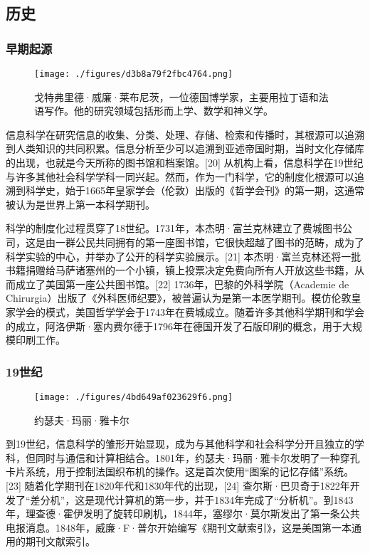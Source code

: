 \subsection{历史}  
\subsubsection{早期起源}
\begin{figure}[ht]
\centering
\texttt{[image: ./figures/d3b8a79f2fbc4764.png]}
\caption{戈特弗里德·威廉·莱布尼茨，一位德国博学家，主要用拉丁语和法语写作。他的研究领域包括形而上学、数学和神义学。} \label{fig_INCE_2}
\end{figure}
信息科学在研究信息的收集、分类、处理、存储、检索和传播时，其根源可以追溯到人类知识的共同积累。信息分析至少可以追溯到亚述帝国时期，当时文化存储库的出现，也就是今天所称的图书馆和档案馆。[20] 从机构上看，信息科学在19世纪与许多其他社会科学学科一同兴起。然而，作为一门科学，它的制度化根源可以追溯到科学史，始于1665年皇家学会（伦敦）出版的《哲学会刊》的第一期，这通常被认为是世界上第一本科学期刊。

科学的制度化过程贯穿了18世纪。1731年，本杰明·富兰克林建立了费城图书公司，这是由一群公民共同拥有的第一座图书馆，它很快超越了图书的范畴，成为了科学实验的中心，并举办了公开的科学实验展示。[21] 本杰明·富兰克林还将一批书籍捐赠给马萨诸塞州的一个小镇，镇上投票决定免费向所有人开放这些书籍，从而成立了美国第一座公共图书馆。[22] 1736年，巴黎的外科学院（Academie de Chirurgia）出版了《外科医师纪要》，被普遍认为是第一本医学期刊。模仿伦敦皇家学会的模式，美国哲学学会于1743年在费城成立。随着许多其他科学期刊和学会的成立，阿洛伊斯·塞内费尔德于1796年在德国开发了石版印刷的概念，用于大规模印刷工作。
\subsubsection{19世纪}
\begin{figure}[ht]
\centering
\texttt{[image: ./figures/4bd649af023629f6.png]}
\caption{约瑟夫·玛丽·雅卡尔} \label{fig_INCE_3}
\end{figure}
到19世纪，信息科学的雏形开始显现，成为与其他科学和社会科学分开且独立的学科，但同时与通信和计算相结合。1801年，约瑟夫·玛丽·雅卡尔发明了一种穿孔卡片系统，用于控制法国织布机的操作。这是首次使用“图案的记忆存储”系统。[23] 随着化学期刊在1820年代和1830年代的出现，[24] 查尔斯·巴贝奇于1822年开发了“差分机”，这是现代计算机的第一步，并于1834年完成了“分析机”。到1843年，理查德·霍伊发明了旋转印刷机，1844年，塞缪尔·莫尔斯发出了第一条公共电报消息。1848年，威廉·F·普尔开始编写《期刊文献索引》，这是美国第一本通用的期刊文献索引。

